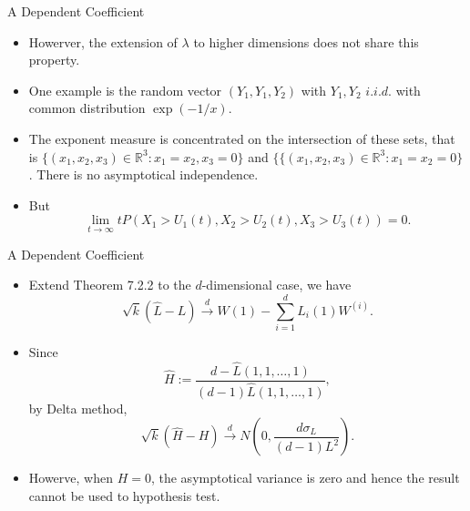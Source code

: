 \documentclass[11pt]{beamer}
\begin{document}
\begin{frame}{A Dependent Coefficient}
\begin{itemize}
\item Howerver, the extension of $\lambda $ to higher dimensions does not share this property.
\item One example is the random vector $(Y_1,Y_1,Y_2)$ with $Y_1,Y_2$ $i.i.d.$ with common distribution $\exp(-1/x)$.
\item The exponent measure is concentrated on the intersection of these sets, that is $\{(x_1,x_2,x_3)\in\mathbb{R}^3: x_1=x_2,x_3=0\}$ and $\{ \{(x_1,x_2,x_3)\in\mathbb{R}^3:x_1=x_2=0\}$. There is no asymptotical independence.
\item But 
\begin{displaymath}
\lim_{t\to \infty}  tP(X_1>U_1(t), X_2>U_2(t), X_3>U_3(t)) =0.
\end{displaymath}
\end{itemize}
\end{frame}
\begin{frame}{A Dependent Coefficient}
\begin{itemize}
\item Extend Theorem 7.2.2 to the $d$-dimensional case, we have 
\begin{displaymath}
\sqrt{k}(\hat{L}-L)\stackrel{d}{\to} W(1)-\sum_{i=1}^d L_i(1)W^{(i)}.
\end{displaymath}
\item Since
$$\hat{H}:=\dfrac{d-\hat{L}(1,1,\dots,1)}{(d-1)\hat{L}(1,1,\dots,1)},$$ 
 by Delta method, 
 \begin{displaymath}
\sqrt{k}(\hat{H}-H)\stackrel{d}{\to} N(0,\dfrac{d\sigma_L}{(d-1)L^2}).
\end{displaymath}
\item Howerve, when $H=0$, the asymptotical variance is zero and hence the result cannot be used to hypothesis test.
\end{itemize}
\end{frame}
\end{document}
